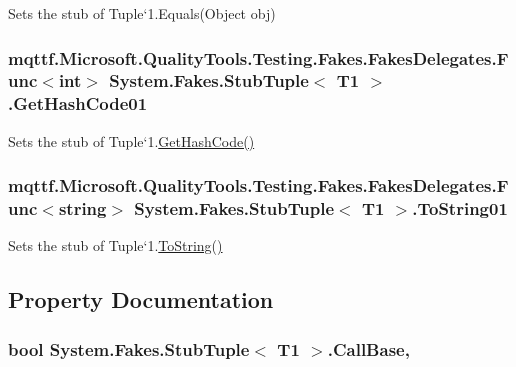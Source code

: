 Sets the stub of Tuple`1.Equals(\-Object obj)

\hypertarget{class_system_1_1_fakes_1_1_stub_tuple_3_01_t1_01_4_a6f43596556d8d254866ea5c0536cde2f}{
\subsubsection[{Get\-Hash\-Code01}]{\setlength{\rightskip}{0pt plus 5cm}mqttf.\-Microsoft.\-Quality\-Tools.\-Testing.\-Fakes.\-Fakes\-Delegates.\-Func$<$int$>$ System.\-Fakes.\-Stub\-Tuple$<$ T1 $>$.Get\-Hash\-Code01}}\label{class_system_1_1_fakes_1_1_stub_tuple_3_01_t1_01_4_a6f43596556d8d254866ea5c0536cde2f}


Sets the stub of Tuple`1.\hyperlink{class_system_1_1_fakes_1_1_stub_tuple_3_01_t1_01_4_a2bb2ead87f42f54af7117f6c6b104f9d}{Get\-Hash\-Code()}

\hypertarget{class_system_1_1_fakes_1_1_stub_tuple_3_01_t1_01_4_a260346aa0eefef745091e54fc155d16d}{
\subsubsection[{To\-String01}]{\setlength{\rightskip}{0pt plus 5cm}mqttf.\-Microsoft.\-Quality\-Tools.\-Testing.\-Fakes.\-Fakes\-Delegates.\-Func$<$string$>$ System.\-Fakes.\-Stub\-Tuple$<$ T1 $>$.To\-String01}}\label{class_system_1_1_fakes_1_1_stub_tuple_3_01_t1_01_4_a260346aa0eefef745091e54fc155d16d}


Sets the stub of Tuple`1.\hyperlink{class_system_1_1_fakes_1_1_stub_tuple_3_01_t1_01_4_a00eaa596b6eb16badf37e7d10974b60a}{To\-String()}



\subsection{Property Documentation}
\hypertarget{class_system_1_1_fakes_1_1_stub_tuple_3_01_t1_01_4_a6d16df72e07a4a99511bd163e73c6a40}{
\subsubsection[{Call\-Base}]{\setlength{\rightskip}{0pt plus 5cm}bool System.\-Fakes.\-Stub\-Tuple$<$ T1 $>$.Call\-Base\hspace{0.3cm}{\ttfamily [get]}, {\ttfamily [set]}}}\label{class_system_1_1_fakes_1_1_stub_tuple_3_01_t1_01_4_a6d16df72e07a4a99511bd163e73c6a40}



